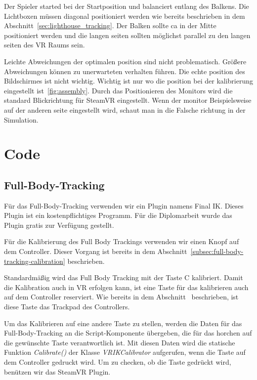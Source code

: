 Der Spieler started bei der Startposition und balanciert entlang des Balkens.
Die Lichtboxen müssen diagonal positioniert werden wie bereits beschrieben in dem Abschnitt~\ref{sec:lighthouse_tracking}.
Der Balken sollte ca in der Mitte positioniert werden und die langen seiten sollten möglichst parallel zu den langen seiten des VR Raums sein.

Leichte Abweichungen der optimalen position sind nicht problematisch.
Größere Abweichungen können zu unerwarteten verhalten führen.
Die echte position des Bildschirmes ist nicht wichtig.
Wichtig ist nur wo die position bei der kalibrierung eingestellt ist~\ref{fig:assembly}.
Durch das Positionieren des Monitors wird die standard Blickrichtung für SteamVR eingestellt.
Wenn der monitor Beispielsweise auf der anderen seite eingestellt wird, schaut man in die Falsche richtung in der Simulation.

\section{Code}
\label{sec:code}

\subsection{Full-Body-Tracking}
\label{sec:full-body-tracking}

Für das Full-Body-Tracking verwenden wir ein Plugin namens Final IK.
Dieses Plugin ist ein kostenpflichtiges Programm.
Für die Diplomarbeit wurde das Plugin gratis zur Verfügung gestellt.

Für die Kalibrierung des Full Body Trackings verwenden wir einen Knopf auf dem Controller.
Dieser Vorgang ist bereits in dem Abschnitt~\ref{subsec:full-body-tracking-calibration} beschrieben.

Standardmäßig wird das Full Body Tracking mit der Taste C kalibriert.
Damit die Kalibration auch in VR erfolgen kann, ist eine Taste für das kalibrieren auch auf dem Controller reserviert.
Wie bereits in dem Abschnitt~ beschrieben, ist diese Taste das Trackpad des Controllers.

Um das Kalibrieren auf eine andere Taste zu stellen, werden die Daten für das Full-Body-Tracking an die Script-Komponente übergeben, die für das horchen auf die gewünschte Taste verantwortlich ist.
Mit diesen Daten wird die statische Funktion \emph{Calibrate()} der Klasse \emph{VRIKCalibrator} aufgerufen, wenn die Taste auf dem Controller gedruckt wird.
Um zu checken, ob die Taste gedrückt wird, benützen wir das SteamVR Plugin.

